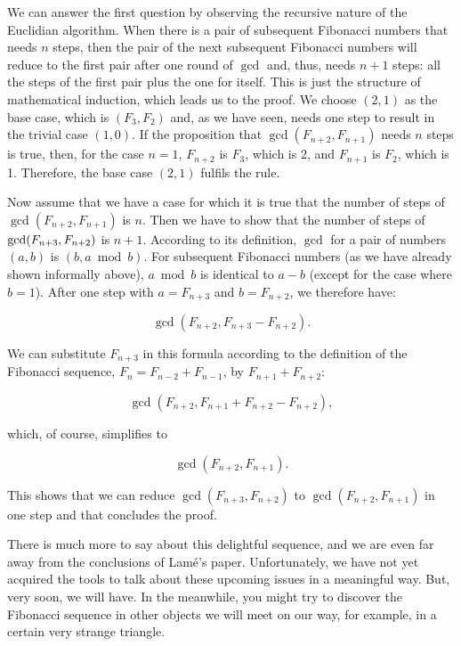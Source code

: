 \documentclass{scrreprt}
\begin{document}
We can answer the first question by observing
the recursive nature of the Euclidian algorithm.
When there is a pair of subsequent Fibonacci numbers
that needs $n$ steps, then the pair of the next
subsequent Fibonacci numbers 
will reduce to the first pair after one round of $\gcd$
and, thus, needs $n + 1$ steps:
all the steps of the first pair plus the one for itself. 
This is just the structure of mathematical induction,
which leads us to the proof.
We choose $(2,1)$ as the base case,
which is $(F_3,F_2)$ and,
as we have seen,
needs one step to result 
in the trivial case $(1,0)$.
If the proposition that $\gcd(F_{n+2}, F_{n+1})$ 
needs $n$ steps is true, then,
for the case $n = 1$,
$F_{n+2}$ is $F_3$, which is 2,
and $F_{n+1}$ is $F_2$, which is 1.
Therefore, the base case $(2,1)$ fulfils the rule.

Now assume that we have a case for which it is true
that the number of steps of $\gcd ( F_{n+2}, F_{n+1})$ is $n$.
Then we have to show that 
the number of steps of 
$\gcd ( F_{n+3}, \\ F_{n+2})$ is $n + 1$.
According to its definition, 
$\gcd$ for a pair of numbers $(a,b)$ is $(b, a \bmod  b)$.
For subsequent Fibonacci numbers 
(as we have already shown informally above),
$a \bmod b$ is identical to $a - b$ 
(except for the case where $b = 1$).
After one step 
with $a=F_{n+3}$ and $b=F_{n+2}$, 
we therefore have:

\[
\gcd(F_{n+2}, F_{n+3} - F_{n+2}).
\]

We can substitute $F_{n+3}$ in this formula
according to the definition of the Fibonacci sequence,
$F_{n} = F_{n-2} + F_{n-1}$,
by $F_{n+1} + F_{n+2}$:

\[
\gcd(F_{n+2}, F_{n+1} + F_{n+2} - F_{n+2}),
\]

which, of course, simplifies to

\[
\gcd(F_{n+2}, F_{n+1}).
\]

This shows that we can reduce
$\gcd(F_{n+3}, F_{n+2})$ 
to 
$\gcd(F_{n+2}, F_{n+1})$
in one step
and that concludes the proof.

There is much more to say about 
this delightful sequence,
and we are even far away from the conclusions
of Lamé's paper.
Unfortunately, we have not yet
acquired the tools to talk
about these upcoming issues
in a meaningful way.
But, very soon, we will have.
In the meanwhile,
you might try to discover the Fibonacci sequence
in other objects we will meet on our way,
for example, in a certain very strange triangle.

\end{document}
